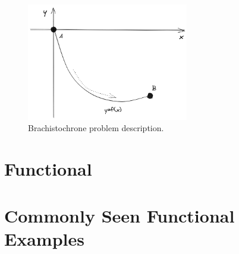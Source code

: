 \begin{figure}
	\centering
	\includegraphics[width=200pt]{chapters/chapter12/figures/brachistochrone_description.png}
	\caption{Brachistochrone problem description.} \label{ch12fig:brachistochrone_description}
\end{figure}

\section{Functional}

\section{Commonly Seen Functional Examples}

